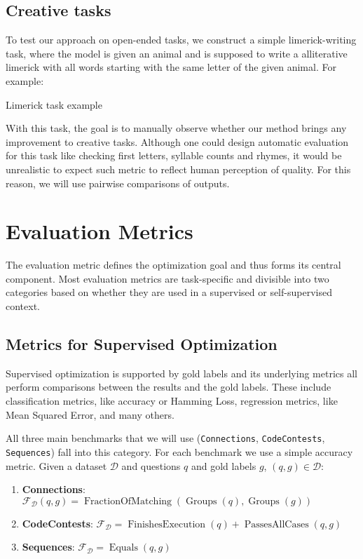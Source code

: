 \subsection{Creative tasks}
To test our approach on open-ended tasks, we construct a simple limerick-writing task, where the model is given an animal and is supposed to write a alliterative limerick
with all words starting with the same letter of the given animal. For example:
\begin{promptbox}[label={box:limerick}]{Limerick task example}
\end{promptbox}
With this task, the goal is to manually observe whether our method brings any improvement to creative tasks.
Although one could design automatic evaluation for this task like checking first letters, syllable counts and rhymes, it would be unrealistic
to expect such metric to reflect human perception of quality. For this reason, we will use pairwise comparisons of outputs.

\section{Evaluation Metrics}
The evaluation metric defines the optimization goal and thus forms its central component. 
Most evaluation metrics are task-specific and divisible into two categories based on whether they are used in a supervised or self-supervised context.
\subsection{Metrics for Supervised Optimization}
Supervised optimization is supported by gold labels and its underlying metrics all perform comparisons between the results and the gold labels.
These include classification metrics, like accuracy or Hamming Loss, regression metrics, like Mean Squared Error, and many others.

All three main benchmarks that we will use (\texttt{Connections}, \texttt{CodeContests}, \texttt{Sequences}) 
fall into this category. For each benchmark we use a simple accuracy metric. Given a dataset $\mathcal{D}$ and questions $q$ and gold labels $g$, $(q,g) \in \mathcal{D}$:
\begin{enumerate}
    \item \textbf{Connections}:  $\mathcal{F}_{\mathcal{D}}(q, g) = \operatorname{FractionOfMatching}(\operatorname{Groups}(q), \operatorname{Groups}(g))$
    \item \textbf{CodeContests}: $\mathcal{F}_{\mathcal{D}} = \operatorname{FinishesExecution}(q) + \operatorname{PassesAllCases}(q, g)$
    \item \textbf{Sequences}: $\mathcal{F}_{\mathcal{D}} = \operatorname{Equals}(q, g)$
\end{enumerate} 

